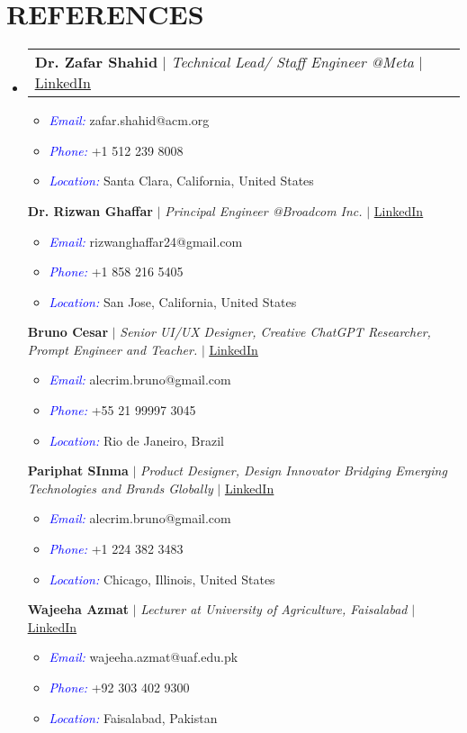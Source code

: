 \documentclass[letterpaper,11pt]{article}
\makeatletter
\newcommand{\resumeItem}[1]{
  \item\small{
    {#1 \vspace{-2pt}}
  }
}
\newcommand{\resumeProjectHeading}[2]{
    \item
    \begin{tabular*}{0.97\textwidth}{l@{\extracolsep{\fill}}r}
      \small#1 & #2 \\
    \end{tabular*}\vspace{-7pt}
}
\newcommand{\resumeSubHeadingListStart}{\begin{itemize}[leftmargin=0.15in, label={}]}
\newcommand{\resumeSubHeadingListEnd}{\end{itemize}}
\newcommand{\resumeItemListStart}{\begin{itemize}}
\newcommand{\resumeItemListEnd}{\end{itemize}\vspace{-5pt}}
\makeatother
\begin{document}
\section{\textbf{REFERENCES}}
\resumeSubHeadingListStart
\resumeProjectHeading
{\textbf{{Dr. Zafar Shahid}} $|$ \emph{Technical Lead/ Staff Engineer @Meta} $|$ {\href{https://www.linkedin.com/in/zafarshahid/}{\underline{LinkedIn}}}}{}
\resumeItemListStart
\resumeItem{\textcolor{blue}{\itshape Email:} zafar.shahid@acm.org}
\resumeItem{\textcolor{blue}{\itshape Phone:} +1 512 239 8008}
\resumeItem{\textcolor{blue}{\itshape Location:} Santa Clara, California, United States}
\resumeItemListEnd
{\textbf{{Dr. Rizwan Ghaffar}} $|$ \emph{Principal Engineer @Broadcom Inc.} $|$ {\href{https://www.linkedin.com/in/rizwan-ghaffar-8283231a/}{\underline{LinkedIn}}}}{}
\resumeItemListStart
\resumeItem{\textcolor{blue}{\itshape Email:} rizwanghaffar24@gmail.com}
\resumeItem{\textcolor{blue}{\itshape Phone:} +1 858 216 5405}
\resumeItem{\textcolor{blue}{\itshape Location:} San Jose, California, United States}
\resumeItemListEnd
{\textbf{{Bruno Cesar}} $|$ \emph{Senior UI/UX Designer, Creative ChatGPT Researcher, Prompt Engineer and Teacher.} $|$ {\href{https://www.linkedin.com/in/brunoalecrim/}{\underline{LinkedIn}}}}{}
\resumeItemListStart
\resumeItem{\textcolor{blue}{\itshape Email:} alecrim.bruno@gmail.com}
\resumeItem{\textcolor{blue}{\itshape Phone:} +55 21 99997 3045}
\resumeItem{\textcolor{blue}{\itshape Location:} Rio de Janeiro, Brazil}
\resumeItemListEnd
{\textbf{{Pariphat SInma}} $|$ \emph{Product Designer, Design Innovator Bridging Emerging Technologies and Brands Globally} $|$ {\href{https://www.linkedin.com/in/pariphat-sinma/}{\underline{LinkedIn}}}}{}
\resumeItemListStart
\resumeItem{\textcolor{blue}{\itshape Email:} alecrim.bruno@gmail.com}
\resumeItem{\textcolor{blue}{\itshape Phone:} +1 224 382 3483}
\resumeItem{\textcolor{blue}{\itshape Location:} Chicago, Illinois, United States}
\resumeItemListEnd
{\textbf{{Wajeeha Azmat}} $|$ \emph{Lecturer at University of Agriculture, Faisalabad} $|$ {\href{https://www.linkedin.com/in/wajeehaazmat/}{\underline{LinkedIn}}}}{}
\resumeItemListStart
\resumeItem{\textcolor{blue}{\itshape Email:} wajeeha.azmat@uaf.edu.pk}
\resumeItem{\textcolor{blue}{\itshape Phone:} +92 303 402 9300}
\resumeItem{\textcolor{blue}{\itshape Location:} Faisalabad, Pakistan}
\resumeItemListEnd
\resumeSubHeadingListEnd

%

\end{document}
